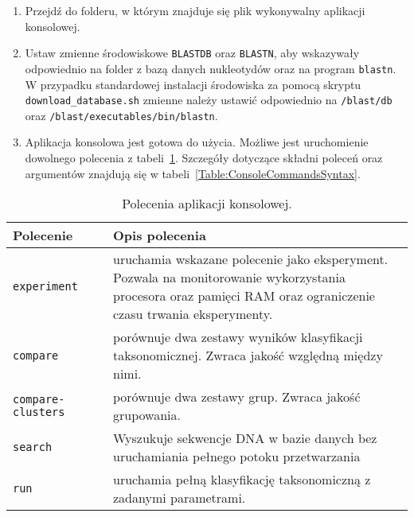                 \begin{enumerate}
                    \item {
                        Przejdź do folderu, w którym znajduje się plik wykonywalny aplikacji konsolowej.
                    }
                    \item {
                        Ustaw zmienne środowiskowe \texttt{BLASTDB} oraz \texttt{BLASTN}, aby wskazywały odpowiednio na folder z bazą danych nukleotydów oraz na program \texttt{blastn}. 
                        W przypadku standardowej instalacji środowiska za pomocą skryptu \texttt{download\_database.sh} zmienne należy ustawić odpowiednio na \texttt{/blast/db} oraz \texttt{/blast/executables/bin/blastn}.
                    }
                    \item {
                        Aplikacja konsolowa jest gotowa do użycia. Możliwe jest uruchomienie dowolnego polecenia z tabeli~\ref{Table:ConsoleCommands}. Szczegóły dotyczące składni poleceń oraz argumentów znajdują się w tabeli~\ref{Table:ConsoleCommandsSyntax}.
                    }
                \end{enumerate}

                \begin{table}[!h] \centering
                    \caption{Polecenia aplikacji konsolowej.}\label{Table:ConsoleCommands}

                    \begin{tabular}{| p{0.25\linewidth} | p{0.75\linewidth} |} 
                        \hline
                        \textbf{Polecenie}              & \textbf{Opis polecenia} \\ \hline\hline
                        \texttt{experiment} 	        & uruchamia wskazane polecenie jako eksperyment. Pozwala na monitorowanie wykorzystania procesora oraz pamięci RAM oraz ograniczenie czasu trwania eksperymenty. \\ \hline
                        \texttt{compare}		        & porównuje dwa zestawy wyników klasyfikacji taksonomicznej. Zwraca jakość względną między nimi. \\ \hline
                        \texttt{compare-clusters} 	    & porównuje dwa zestawy grup. Zwraca jakość grupowania. \\ \hline
                        \texttt{search}                 & Wyszukuje sekwencje DNA w bazie danych bez uruchamiania pełnego potoku przetwarzania \\ \hline
                        \texttt{run}		            & uruchamia pełną klasyfikację taksonomiczną z zadanymi parametrami. \\ \hline
                    \end{tabular}
                
                \end{table}

